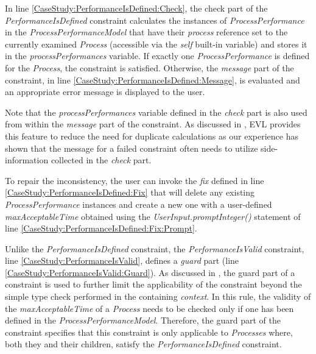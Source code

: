 In line \ref{CaseStudy:PerformanceIsDefined:Check}, the check part of the \emph{PerformanceIsDefined} constraint calculates the instances of \emph{ProcessPerformance} in the \emph{ProcessPerformanceModel} that have their \emph{process} reference set to the currently examined \emph{Process} (accessible via the \emph{self} built-in variable) and stores it in the \emph{processPerformances} variable. If exactly one \emph{ProcessPerformance} is defined for the \emph{Process}, the constraint is satisfied. Otherwise, the \emph{message} part of the constraint, in line \ref{CaseStudy:PerformanceIsDefined:Message}, is evaluated and an appropriate error message is displayed to the user. 

Note that the \emph{processPerformances} variable defined in the \emph{check} part is also used from within the \emph{message} part of the constraint. As discussed in \cite{EVL}, EVL provides this feature to reduce the need for duplicate calculations as our experience has shown that the message for a failed constraint often needs to utilize side-information collected in the \emph{check} part.

To repair the inconsistency, the user can invoke the \emph{fix} defined in line \ref{CaseStudy:PerformanceIsDefined:Fix} that will delete any existing \emph{ProcessPerformance} instances and create a new one with a user-defined \emph{maxAcceptableTime} obtained using the \emph{UserInput.promptInteger()} statement of line \ref{CaseStudy:PerformanceIsDefined:Fix:Prompt}.

Unlike the \emph{PerformanceIsDefined} constraint, the \emph{PerformanceIsValid} constraint, line \ref{CaseStudy:PerformanceIsValid}, defines a \emph{guard} part (line \ref{CaseStudy:PerformanceIsValid:Guard}). As discussed in \cite{EVL}, the guard part of a constraint is used to further limit the applicability of the constraint beyond the simple type check performed in the containing \emph{context}. In this rule, the validity of the \emph{maxAcceptableTime} of a \emph{Process} needs to be checked only if one has been defined in the \emph{ProcessPerformanceModel}. Therefore, the guard part of the constraint specifies that this constraint is only applicable to \emph{Processes} where, both they and their children, satisfy the \emph{PerformanceIsDefined} constraint.

